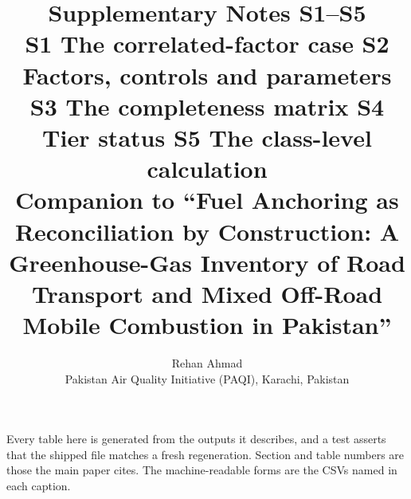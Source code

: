 \documentclass[a4paper,11pt]{article}
\title{Supplementary Notes S1--S5\\[2pt]
\large S1 The correlated-factor case \textbullet{} S2 Factors, controls and
parameters \textbullet{} S3 The completeness matrix \textbullet{} S4 Tier status
\textbullet{} S5 The class-level calculation\\[4pt]
\normalsize Companion to ``Fuel Anchoring as Reconciliation by Construction: A
Greenhouse-Gas Inventory of Road Transport and Mixed Off-Road Mobile Combustion in
Pakistan''}
\author{Rehan Ahmad\\ \small Pakistan Air Quality Initiative (PAQI), Karachi, Pakistan}
\date{}
\begin{document}
\maketitle

\ReleaseCover


Every table here is generated from the outputs it describes, and a test asserts that
the shipped file matches a fresh regeneration. Section and table numbers are those
the main paper cites. The machine-readable forms are the CSVs named in each caption.

\clearpage

\clearpage

\clearpage

\clearpage

\clearpage


\end{document}
